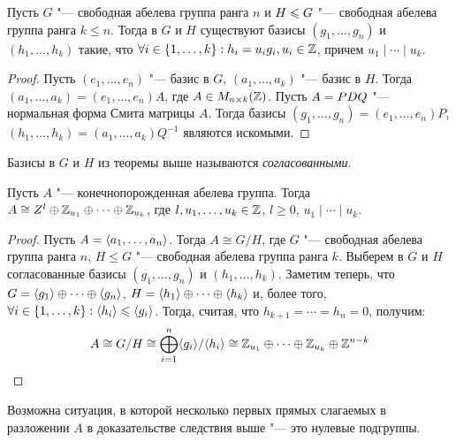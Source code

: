 \begin{theorem}
	Пусть $G$ "--- свободная абелева группа ранга $n$ и $H \hm\le G$ "--- свободная абелева группа ранга $k \le n$. Тогда в $G$ и $H$ существуют базисы $(g_1, \dotsc, g_n)$ и $(h_1, \dotsc, h_k)$ такие, что $\forall i \in \{1, \dotsc, k\}: h_i = u_ig_i, u_i \in \mathbb{Z}$, причем $u_1\mid \dotsb \mid u_k$.
\end{theorem}

\begin{proof}
	Пусть $(e_1, \dotsc, e_n)$ "--- базис в $G$, $(a_1, \dotsc, a_k)$ "--- базис в $H$. Тогда $(a_1, \dotsc, a_k) = (e_1, \dotsc, e_n)A$, где $A \in M_{n \times k}(\mathbb{Z})$. Пусть $A \hm= PDQ$ "--- нормальная форма Смита матрицы $A$. Тогда базисы $(g_1, \dotsc, g_n) = (e_1, \dotsc, e_n)P$, $(h_1, \dotsc, h_k) = (a_1, \dotsc, a_k)Q^{-1}$ являются искомыми.
\end{proof}

\begin{note}
	Базисы в $G$ и $H$ из теоремы выше называются \textit{согласованными}.
\end{note}

\begin{corollary}
	Пусть $A$ "--- конечнопорожденная абелева группа. Тогда $A \cong Z^l \oplus \mathbb{Z}_{u_1} \oplus \dots \oplus \mathbb{Z}_{u_k}$, где $l, u_1, \dotsc, u_k \in \mathbb{Z}$, $l \ge 0$, $u_1 \mid \dotsb \mid u_k$.
\end{corollary}

\begin{proof}
	Пусть $A = \langle a_1, \dotsc, a_n \rangle$. Тогда $A \cong G / H$, где $G$ "--- свободная абелева группа ранга $n$, $H \le G$ "--- свободная абелева группа ранга $k$. Выберем в $G$ и $H$ согласованные базисы $(g_1, \dotsc, g_n)$ и $(h_1, \dotsc, h_k)$. Заметим теперь, что $G \hm= \gl g_1\gr \oplus \dotsb \oplus \gl g_n\gr$, $H \hm= \gl h_1\gr \oplus \dotsb \oplus \gl h_k\gr$ и, более того, $\forall i \hm\in \{1, \dotsc, k\}: \gl h_i\gr \le \gl g_i\gr$. Тогда, считая, что $h_{k + 1} = \dotsb = h_n = 0$, получим:
	\[A \cong G/ H \cong \bigoplus\limits_{i = 1}^n\langle g_i\rangle/\langle h_i\rangle \cong \mathbb{Z}_{u_1} \oplus \dotsb \oplus \mathbb{Z}_{u_k} \oplus \mathbb{Z}^{n-k}\]
\end{proof}

\begin{note}
	Возможна ситуация, в которой несколько первых прямых слагаемых в разложении $A$ в доказательстве следствия выше "--- это нулевые подгруппы.
\end{note}